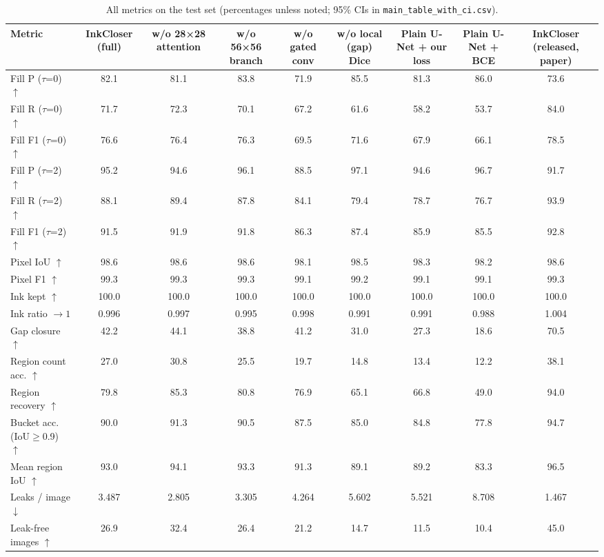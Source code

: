 \begin{table}[t]
\centering
\small
\begin{tabular}{lcccccccc}
\toprule
Metric & InkCloser (full) & w/o 28×28 attention & w/o 56×56 branch & w/o gated conv & w/o local (gap) Dice & Plain U-Net + our loss & Plain U-Net + BCE & InkCloser (released, paper) \\
\midrule
Fill P ($\tau$=0) $\uparrow$ & 82.1 & 81.1 & 83.8 & 71.9 & 85.5 & 81.3 & 86.0 & 73.6 \\
Fill R ($\tau$=0) $\uparrow$ & 71.7 & 72.3 & 70.1 & 67.2 & 61.6 & 58.2 & 53.7 & 84.0 \\
Fill F1 ($\tau$=0) $\uparrow$ & 76.6 & 76.4 & 76.3 & 69.5 & 71.6 & 67.9 & 66.1 & 78.5 \\
Fill P ($\tau$=2) $\uparrow$ & 95.2 & 94.6 & 96.1 & 88.5 & 97.1 & 94.6 & 96.7 & 91.7 \\
Fill R ($\tau$=2) $\uparrow$ & 88.1 & 89.4 & 87.8 & 84.1 & 79.4 & 78.7 & 76.7 & 93.9 \\
Fill F1 ($\tau$=2) $\uparrow$ & 91.5 & 91.9 & 91.8 & 86.3 & 87.4 & 85.9 & 85.5 & 92.8 \\
Pixel IoU $\uparrow$ & 98.6 & 98.6 & 98.6 & 98.1 & 98.5 & 98.3 & 98.2 & 98.6 \\
Pixel F1 $\uparrow$ & 99.3 & 99.3 & 99.3 & 99.1 & 99.2 & 99.1 & 99.1 & 99.3 \\
Ink kept $\uparrow$ & 100.0 & 100.0 & 100.0 & 100.0 & 100.0 & 100.0 & 100.0 & 100.0 \\
Ink ratio $\to 1$ & 0.996 & 0.997 & 0.995 & 0.998 & 0.991 & 0.991 & 0.988 & 1.004 \\
Gap closure $\uparrow$ & 42.2 & 44.1 & 38.8 & 41.2 & 31.0 & 27.3 & 18.6 & 70.5 \\
Region count acc. $\uparrow$ & 27.0 & 30.8 & 25.5 & 19.7 & 14.8 & 13.4 & 12.2 & 38.1 \\
Region recovery $\uparrow$ & 79.8 & 85.3 & 80.8 & 76.9 & 65.1 & 66.8 & 49.0 & 94.0 \\
Bucket acc. (IoU$\geq$0.9) $\uparrow$ & 90.0 & 91.3 & 90.5 & 87.5 & 85.0 & 84.8 & 77.8 & 94.7 \\
Mean region IoU $\uparrow$ & 93.0 & 94.1 & 93.3 & 91.3 & 89.1 & 89.2 & 83.3 & 96.5 \\
Leaks / image $\downarrow$ & 3.487 & 2.805 & 3.305 & 4.264 & 5.602 & 5.521 & 8.708 & 1.467 \\
Leak-free images $\uparrow$ & 26.9 & 32.4 & 26.4 & 21.2 & 14.7 & 11.5 & 10.4 & 45.0 \\
\bottomrule
\end{tabular}
\caption{All metrics on the test set (percentages unless noted; 95\% CIs in \texttt{main\_table\_with\_ci.csv}).}
\label{tab:all_results}
\end{table}